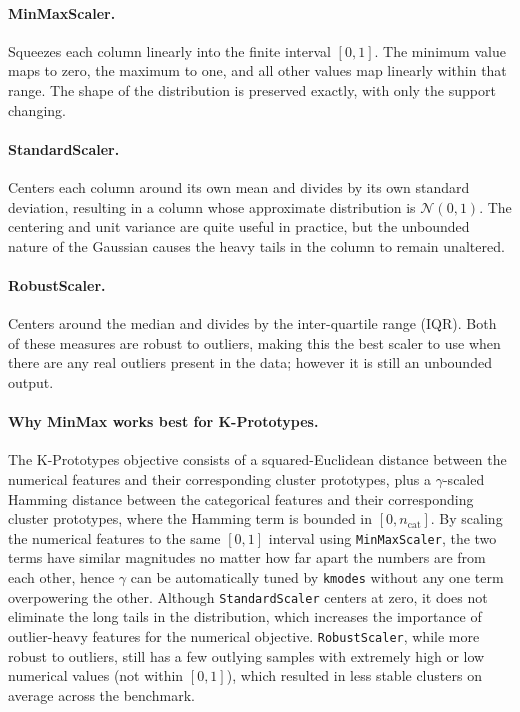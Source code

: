 \paragraph{MinMaxScaler.} Squeezes each column linearly into the finite interval \([0, 1]\). The minimum value maps to zero, the maximum to one, and all other values map linearly within that range. The shape of the distribution is preserved exactly, with only the support changing.

\paragraph{StandardScaler.} Centers each column around its own mean and divides by its own standard deviation, resulting in a column whose approximate distribution is \(\mathcal{N}(0, 1)\). The centering and unit variance are quite useful in practice, but the unbounded nature of the Gaussian causes the heavy tails in the column to remain unaltered.

\paragraph{RobustScaler.} Centers around the median and divides by the inter-quartile range (IQR). Both of these measures are robust to outliers, making this the best scaler to use when there are any real outliers present in the data; however it is still an unbounded output.

\paragraph{Why MinMax works best for K-Prototypes.} The K-Prototypes objective consists of a squared-Euclidean distance between the numerical features and their corresponding cluster prototypes, plus a \(\gamma\)-scaled Hamming distance between the categorical features and their corresponding cluster prototypes, where the Hamming term is bounded in \([0, n_{\text{cat}}]\). By scaling the numerical features to the same \([0, 1]\) interval using \texttt{MinMaxScaler}, the two terms have similar magnitudes no matter how far apart the numbers are from each other, hence \(\gamma\) can be automatically tuned by \texttt{kmodes} without any one term overpowering the other. Although \texttt{StandardScaler} centers at zero, it does not eliminate the long tails in the distribution, which increases the importance of outlier-heavy features for the numerical objective. \texttt{RobustScaler}, while more robust to outliers, still has a few outlying samples with extremely high or low numerical values (not within \([0, 1]\)), which resulted in less stable clusters on average across the benchmark.

